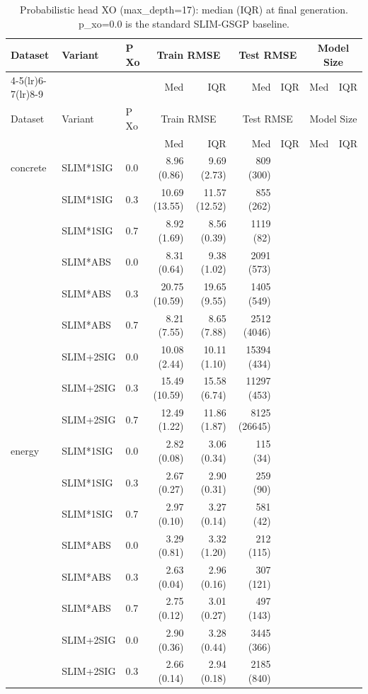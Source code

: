 \begin{longtable}{lllrrrrrr}
\caption{Probabilistic head XO (max\_depth=17): median (IQR) at final generation. p\_xo=0.0 is the standard SLIM-GSGP baseline.} \label{tab:prob_xo_final} \\
\toprule
Dataset & Variant & P Xo & \multicolumn{2}{c}{Train RMSE} & \multicolumn{2}{c}{Test RMSE} & \multicolumn{2}{c}{Model Size} \\
\cmidrule(lr){4-5}\cmidrule(lr){6-7}\cmidrule(lr){8-9}
 & &  & Med & IQR & Med & IQR & Med & IQR \\
\midrule
\endfirsthead
\toprule
Dataset & Variant & P Xo & \multicolumn{2}{c}{Train RMSE} & \multicolumn{2}{c}{Test RMSE} & \multicolumn{2}{c}{Model Size} \\
 & &  & Med & IQR & Med & IQR & Med & IQR \\
\midrule
\endhead
\bottomrule
\endfoot
concrete & SLIM*1SIG & 0.0 & 8.96 (0.86) & 9.69 (2.73) & 809 (300) \\
 & SLIM*1SIG & 0.3 & 10.69 (13.55) & 11.57 (12.52) & 855 (262) \\
 & SLIM*1SIG & 0.7 & 8.92 (1.69) & 8.56 (0.39) & 1119 (82) \\
 & SLIM*ABS & 0.0 & 8.31 (0.64) & 9.38 (1.02) & 2091 (573) \\
 & SLIM*ABS & 0.3 & 20.75 (10.59) & 19.65 (9.55) & 1405 (549) \\
 & SLIM*ABS & 0.7 & 8.21 (7.55) & 8.65 (7.88) & 2512 (4046) \\
 & SLIM+2SIG & 0.0 & 10.08 (2.44) & 10.11 (1.10) & 15394 (434) \\
 & SLIM+2SIG & 0.3 & 15.49 (10.59) & 15.58 (6.74) & 11297 (453) \\
 & SLIM+2SIG & 0.7 & 12.49 (1.22) & 11.86 (1.87) & 8125 (26645) \\
\midrule
energy & SLIM*1SIG & 0.0 & 2.82 (0.08) & 3.06 (0.34) & 115 (34) \\
 & SLIM*1SIG & 0.3 & 2.67 (0.27) & 2.90 (0.31) & 259 (90) \\
 & SLIM*1SIG & 0.7 & 2.97 (0.10) & 3.27 (0.14) & 581 (42) \\
 & SLIM*ABS & 0.0 & 3.29 (0.81) & 3.32 (1.20) & 212 (115) \\
 & SLIM*ABS & 0.3 & 2.63 (0.04) & 2.96 (0.16) & 307 (121) \\
 & SLIM*ABS & 0.7 & 2.75 (0.12) & 3.01 (0.27) & 497 (143) \\
 & SLIM+2SIG & 0.0 & 2.90 (0.36) & 3.28 (0.44) & 3445 (366) \\
 & SLIM+2SIG & 0.3 & 2.66 (0.14) & 2.94 (0.18) & 2185 (840) \\

\end{longtable}
